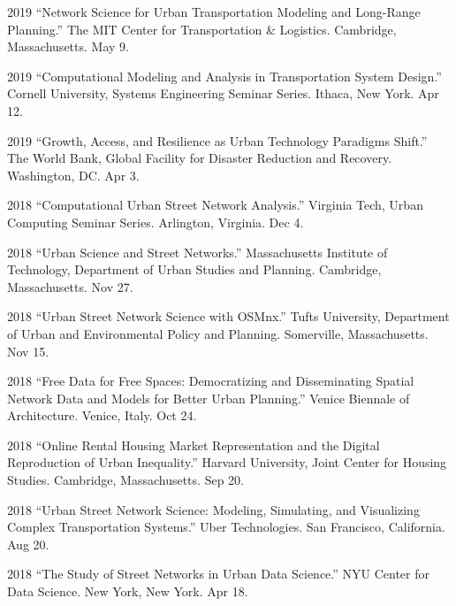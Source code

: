 \documentclass[12pt,letterpaper]{report}
\begin{document}
	\begin{tablist}

		\item[2019] \tab \enquote{Network Science for Urban Transportation Modeling and Long-Range Planning.} The MIT Center for Transportation \& Logistics. Cambridge, Massachusetts. May 9.

		\item[2019] \tab \enquote{Computational Modeling and Analysis in Transportation System Design.} Cornell University, Systems Engineering Seminar Series. Ithaca, New York. Apr 12.

		\item[2019] \tab \enquote{Growth, Access, and Resilience as Urban Technology Paradigms Shift.} The World Bank, Global Facility for Disaster Reduction and Recovery. Washington, DC. Apr 3.

		\item[2018] \tab \enquote{Computational Urban Street Network Analysis.} Virginia Tech, Urban Computing Seminar Series. Arlington, Virginia. Dec 4.

		\item[2018] \tab \enquote{Urban Science and Street Networks.} Massachusetts Institute of Technology, Department of Urban Studies and Planning. Cambridge, Massachusetts. Nov 27.

		\item[2018] \tab \enquote{Urban Street Network Science with OSMnx.} Tufts University, Department of Urban and Environmental Policy and Planning. Somerville, Massachusetts. Nov 15.

		\item[2018] \tab \enquote{Free Data for Free Spaces: Democratizing and Disseminating Spatial Network Data and Models for Better Urban Planning.} Venice Biennale of Architecture. Venice, Italy. Oct 24.

		\item[2018] \tab \enquote{Online Rental Housing Market Representation and the Digital Reproduction of Urban Inequality.} Harvard University, Joint Center for Housing Studies. Cambridge, Massachusetts. Sep 20.

		\item[2018] \tab \enquote{Urban Street Network Science: Modeling, Simulating, and Visualizing Complex Transportation Systems.} Uber Technologies. San Francisco, California. Aug 20.

		\item[2018] \tab \enquote{The Study of Street Networks in Urban Data Science.} NYU Center for Data Science. New York, New York. Apr 18.


\end{tablist}
\end{document}
